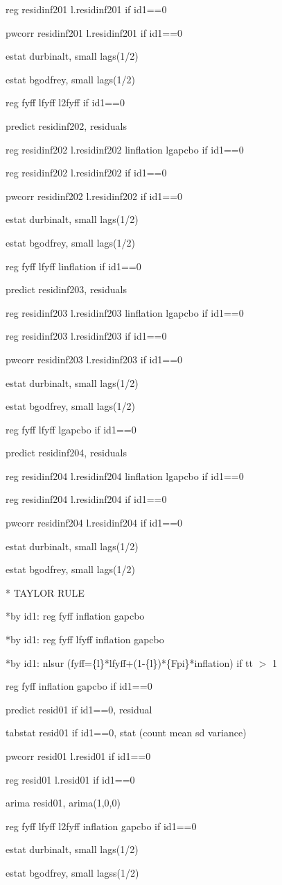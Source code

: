 \documentclass[12pt,a4paper]{article}%
\begin{document}
reg residinf201 l.residinf201 if id1==0

pwcorr residinf201 l.residinf201 if id1==0

estat durbinalt, small lags(1/2)

estat bgodfrey, small lags(1/2)

reg fyff lfyff l2fyff if id1==0

predict residinf202, residuals

reg residinf202 l.residinf202 linflation lgapcbo if id1==0

reg residinf202 l.residinf202 if id1==0

pwcorr residinf202 l.residinf202 if id1==0

estat durbinalt, small lags(1/2)

estat bgodfrey, small lags(1/2)

reg fyff lfyff linflation if id1==0

predict residinf203, residuals

reg residinf203 l.residinf203 linflation lgapcbo if id1==0

reg residinf203 l.residinf203 if id1==0

pwcorr residinf203 l.residinf203 if id1==0

estat durbinalt, small lags(1/2)

estat bgodfrey, small lags(1/2)

reg fyff lfyff lgapcbo if id1==0

predict residinf204, residuals

reg residinf204 l.residinf204 linflation lgapcbo if id1==0

reg residinf204 l.residinf204 if id1==0

pwcorr residinf204 l.residinf204 if id1==0

estat durbinalt, small lags(1/2)

estat bgodfrey, small lags(1/2)

* TAYLOR RULE

*by id1: reg fyff inflation gapcbo

*by id1: reg fyff lfyff inflation gapcbo

*by id1: nlsur (fyff=\{l\}*lfyff+(1-\{l\})*\{Fpi\}*inflation) if tt%
$>$%
1

reg fyff inflation gapcbo if id1==0

predict resid01 if id1==0, residual

tabstat resid01 if id1==0, stat (count mean sd variance)

pwcorr resid01 l.resid01 if id1==0

reg resid01 l.resid01 if id1==0

arima resid01, arima(1,0,0)

reg fyff lfyff l2fyff inflation gapcbo if id1==0

estat durbinalt, small lags(1/2)

estat bgodfrey, small lagss(1/2)
\end{document}
